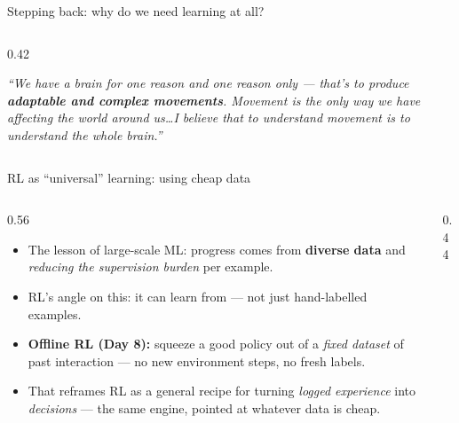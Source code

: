 \begin{frame}{Stepping back: why do we need learning at all?}
\begin{columns}[c]
\begin{column}{0.42\textwidth}
{\begin{minipage}{0.94\linewidth}
\vspace{0.5em}
{\scriptsize\itshape ``We have a brain for one reason and one reason only --- that's to
produce \textbf{adaptable and complex movements}. Movement is the only way we have
affecting the world around us\dots I believe that to understand movement is to understand
the whole brain.''}
\end{minipage}}
\end{column}
\end{columns}
\end{frame}

\begin{frame}{RL as ``universal'' learning: using cheap data}
\begin{columns}[c]
\begin{column}{0.56\textwidth}
\begin{itemize}\footnotesize\itemsep0.5em
    \item The lesson of large-scale ML: progress comes from \textbf{diverse data} and
          \emph{reducing the supervision burden} per example.
    \item RL's angle on this: it can learn from  ---
          not just hand-labelled examples.
    \item \textbf{Offline RL (Day 8):} squeeze a good policy out of a \emph{fixed dataset}
          of past interaction --- no new environment steps, no fresh labels.
    \item That reframes RL as a general recipe for turning \emph{logged experience} into
          \emph{decisions} --- the same engine, pointed at whatever data is cheap.
\end{itemize}
\end{column}
\begin{column}{0.44\textwidth}
\centering
{}
\end{column}
\end{columns}
\end{frame}

